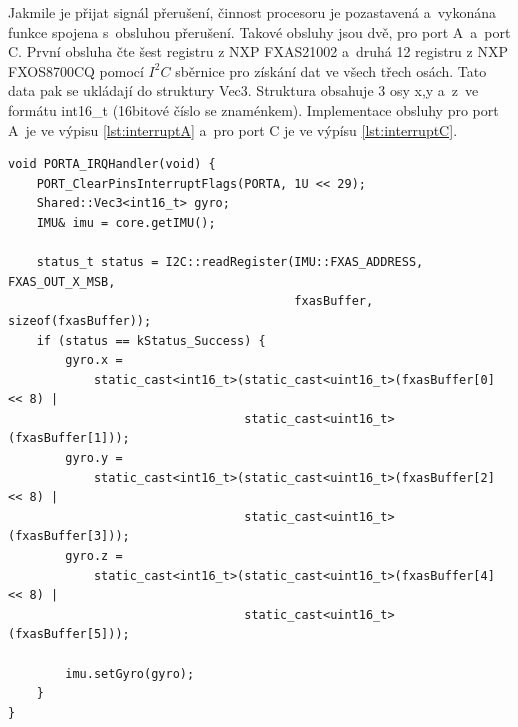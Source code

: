 Jakmile je přijat signál přerušení, činnost procesoru je pozastavená a~vykonána funkce spojena s~obsluhou přerušení. Takové obsluhy jsou dvě, pro port A~a~port C. První obsluha čte šest registru z NXP FXAS21002 a~druhá 12 registru z NXP FXOS8700CQ pomocí $I^2C$ sběrnice pro získání dat ve všech třech osách. Tato data pak se ukládají do struktury Vec3. Struktura obsahuje 3 osy x,y a~z~ve formátu int16\_t (16bitové číslo se znaménkem). Implementace obsluhy pro port A~je ve výpisu \ref{lst:interruptA} a~pro port C je ve výpísu \ref{lst:interruptC}.

\begin{lstlisting}[caption = Funkce obsluhy přerušení na portu A, label = lst:interruptA]
void PORTA_IRQHandler(void) {
    PORT_ClearPinsInterruptFlags(PORTA, 1U << 29);
    Shared::Vec3<int16_t> gyro;
    IMU& imu = core.getIMU();

    status_t status = I2C::readRegister(IMU::FXAS_ADDRESS, FXAS_OUT_X_MSB,
                                        fxasBuffer, sizeof(fxasBuffer));
    if (status == kStatus_Success) {
        gyro.x =
            static_cast<int16_t>(static_cast<uint16_t>(fxasBuffer[0] << 8) |
                                 static_cast<uint16_t>(fxasBuffer[1]));
        gyro.y =
            static_cast<int16_t>(static_cast<uint16_t>(fxasBuffer[2] << 8) |
                                 static_cast<uint16_t>(fxasBuffer[3]));
        gyro.z =
            static_cast<int16_t>(static_cast<uint16_t>(fxasBuffer[4] << 8) |
                                 static_cast<uint16_t>(fxasBuffer[5]));

        imu.setGyro(gyro);
    }
}
\end{lstlisting}

